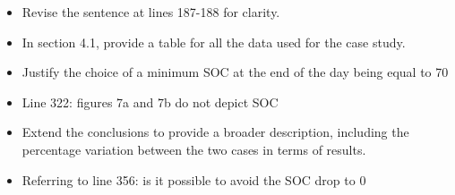\documentclass[11pt,a4paper,final]{article}
\begin{document}
\begin{itemize}
\item Revise the sentence at lines 187-188 for clarity.
\end{itemize}

\begin{itemize}
\item In section 4.1, provide a table for all the data used for the case study.
\end{itemize}

\begin{itemize}
\item Justify the choice of a minimum SOC at the end of the day being equal to 70%
\end{itemize}

\begin{itemize}
\item Line 322: figures 7a and 7b do not depict SOC
\end{itemize}

\begin{itemize}
\item Extend the conclusions to provide a broader description, including the percentage variation between the two cases in terms of results.
\end{itemize}

\begin{itemize}
\item Referring to line 356: is it possible to avoid the SOC drop to 0%
\end{itemize}
\end{document}
